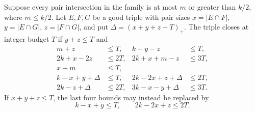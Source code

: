 \begin{lemma}\label{lem:nearcore}
Suppose every pair intersection in the family is at most $m$ or greater
than $k/2$, where $m\le k/2$. Let $E,F,G$ be a good triple with pair
sizes $x=|E\cap F|$, $y=|E\cap G|$, $z=|F\cap G|$, and put
$\Delta=(x+y+z-T)_+$. The triple closes at integer budget $T$ if
$y+z\le T$ and
\begin{align}
 m+z&\le T,& k+y-z&\le T,\label{eq:ncfirst}\\
 2k+x-2z&\le2T,&2k+x+m-z&\le3T,\nonumber\\
 x+m&\le T,&&\nonumber\\
 k-x+y+\Delta&\le T,&2k-2x+z+\Delta&\le2T,\label{eq:nclast}\\
 2k-z+\Delta&\le2T,&3k-x-y+\Delta&\le3T.\nonumber
\end{align}
If $x+y+z\le T$, the last four bounds may instead be replaced by
\begin{equation}\label{eq:emptycore}
 k-x+y\le T,\qquad 2k-2x+z\le2T.
\end{equation}
\end{lemma}
